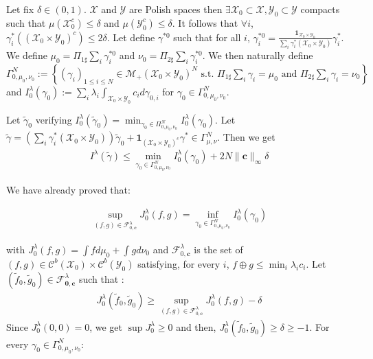 \begin{prv*}
Let fix $\delta\in (0,1)$. $\mathcal{X}$ and $\mathcal{Y}$ are Polish spaces then $\exists  \mathcal{X}_0\subset \mathcal{X},  \mathcal{Y}_0\subset \mathcal{Y}$ compacts such that $\mu(\mathcal{X}_0^c) \leq  \delta$ and $\mu(\mathcal{Y}_0^c) \leq  \delta$.  It follows that $\forall i$, $\gamma^*_i((\mathcal{X}_0\times\mathcal{Y}_0)^c)\leq 2\delta$. Let define $\gamma^{*0}$ such that for all $i$, $\gamma^{*0}_{i}=\frac{\mathbf{1}_{\mathcal{X}_0\times\mathcal{Y}_0}}{\sum_i\gamma_i
^*(\mathcal{X}_0\times\mathcal{Y}_0)}\gamma^*_i$. We define $\mu_0 = \Pi_{1\sharp}\sum_i\gamma_{i}^{*0}$ and  $\nu_0 = \Pi_{2\sharp}\sum_i\gamma_{i}^{*0}$. We then naturally define $\Gamma^{N}_{0,\mu_0,\nu_0} :=\left\{(\gamma_i)_{1\leq i\leq N}\in \mathcal{M}_+(\mathcal{X}_0\times \mathcal{Y}_0)^N\text{ s.t. } \Pi_{1\sharp}\sum_i\gamma_i=\mu_0 \text{ and } \Pi_{2\sharp}\sum_i\gamma_i=\nu_0\right\}$ and $I^\lambda_0(\gamma_0) := \sum_i\lambda_i\int_{\mathcal{X}_0\times\mathcal{Y}_0}c_id\gamma_{0,i}$ for $\gamma_0\in\Gamma^{N}_{0,\mu_0,\nu_0}$. 

Let $\tilde{\gamma}_0$ verifying  $I^\lambda_0(\tilde{\gamma}_0) = \min_{\gamma_0\in\Pi^N_{0,\mu_0,\nu_0}}I^\lambda_0(\gamma_0)$. Let $\tilde{\gamma} = \left(\sum_i\gamma_i^*(\mathcal{X}_0\times\mathcal{Y}_0)\right)\tilde{\gamma}_0+\mathbf{1}_{(\mathcal{X}_0\times\mathcal{Y}_0)^c}\gamma^*\in \Gamma^N_{\mu,\nu}$. Then we get 
\begin{align*}
I^\lambda(\tilde{\gamma})\leq \min_{\gamma_0\in\Gamma^N_{0,\mu_0,\nu_0}}I^\lambda_0(\gamma_0)+2N\lVert \mathbf{c}\rVert_\infty\delta
\end{align*}

We have already proved that:

\begin{align*}
\sup\limits_{(f,g)\in\mathcal{F}^\lambda_{0,\mathbf{c}}}J_0^\lambda(f,g) = \inf\limits_{\gamma_0\in\Gamma^N_{0,\mu_0,\nu_0}}I_0^\lambda(\gamma_0)
\end{align*}

with $J_0^\lambda(f,g) = \int fd\mu_0+\int gd\nu_0$ and $\mathcal{F}^\lambda_{0,\mathbf{c}}$ is the set of $(f,g)\in\mathcal{C}^b(\mathcal{X}_0)\times \mathcal{C}^b(\mathcal{Y}_0)$ satisfying, for every $i$, $f\oplus g\leq\min_i\lambda_i c_i$. Let $(\tilde{f}_0,\tilde{g}_0)\in \mathcal{F}^\lambda_\mathbf{0,c}$ such that :
\begin{align*}
    J_0^\lambda(\tilde{f}_0,\tilde{g}_0)\geq \sup\limits_{(f,g)\in\mathcal{F}^\lambda_{0,\mathbf{c}}}J_0^\lambda(f,g)-\delta
\end{align*}
Since $J_0^\lambda(0,0)=0$, we get $\sup J_0^\lambda\geq 0$ and then,  $J_0^\lambda(\tilde{f}_0,\tilde{g}_0)\geq \delta\geq-1$. For every $\gamma_0 \in \Gamma^N_{0,\mu_0,\nu_0}$:


\end{prv*}
